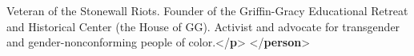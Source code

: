 \begin{shaded}
\mbox{}\newline 
\hspace*{1em}Veteran of the Stonewall Riots. Founder of the\mbox{}\newline 
\hspace*{1em}\hspace*{1em}\hspace*{1em}\hspace*{1em} Griffin-Gracy Educational Retreat and Historical\mbox{}\newline 
\hspace*{1em}\hspace*{1em}\hspace*{1em}\hspace*{1em} Center (the House of GG). Activist and advocate for\mbox{}\newline 
\hspace*{1em}\hspace*{1em}\hspace*{1em}\hspace*{1em} transgender and gender-nonconforming people of\mbox{}\newline 
\hspace*{1em}\hspace*{1em}\hspace*{1em}\hspace*{1em} color.{</\textbf{p}>}\mbox{}\newline 
{}\mbox{}\newline 
{</\textbf{person}>}\end{shaded}\egroup\par \par
